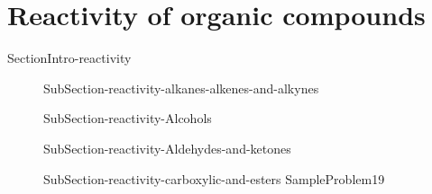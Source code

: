 \documentclass[main.tex]{subfiles}
\newcommand\chapterlabel{Ch-orgo}\setcounter{figurenewcounter}{0}\setcounter{tablenewcounter}{0}\setcounter{formulanewcounter}{0}
\begin{document}
{\begin{description}
 \end{description}
 
 
\section{Reactivity of organic compounds}{SectionIntro-reactivity}
\sloppy\begin{description}
\item[] {SubSection-reactivity-alkanes-alkenes-and-alkynes}
\item[] {SubSection-reactivity-Alcohols}
 \item[] {SubSection-reactivity-Aldehydes-and-ketones}
 \item[] {SubSection-reactivity-carboxylic-and-esters}
  {SampleProblem19}
 \end{description}
 
 }
 
 
\checkoddpage\ifoddpage \clearpage\thispagestyle{empty}\mbox{}\clearpage \else  \fi 
\end{document}
